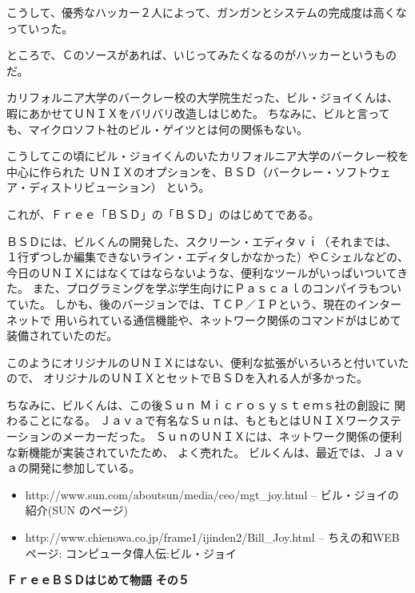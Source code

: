 \documentclass[12pt]{jarticle}
\begin{document}
こうして、優秀なハッカー２人によって、ガンガンとシステムの完成度は高くなっていった。

\bigskip

ところで、Ｃのソースがあれば、いじってみたくなるのがハッカーというものだ。

\bigskip

カリフォルニア大学のバークレー校の大学院生だった、ビル・ジョイくんは、
暇にあかせてＵＮＩＸをバリバリ改造しはじめた。
ちなみに、ビルと言っても、マイクロソフト社のビル・ゲイツとは何の関係もない。

こうしてこの頃にビル・ジョイくんのいたカリフォルニア大学のバークレー校を中心に作られた
ＵＮＩＸのオプションを、ＢＳＤ（バークレー・ソフトウェア・ディストリビューション）
という。

これが、Ｆｒｅｅ「ＢＳＤ」の「ＢＳＤ」のはじめてである。

ＢＳＤには、ビルくんの開発した、スクリーン・エディタｖｉ（それまでは、
１行ずつしか編集できないライン・エディタしかなかった）やＣシェルなどの、
今日のＵＮＩＸにはなくてはならないような、便利なツールがいっぱいついてきた。
また、プログラミングを学ぶ学生向けにＰａｓｃａｌのコンパイラもついていた。
しかも、後のバージョンでは、ＴＣＰ／ＩＰという、現在のインターネットで
用いられている通信機能や、ネットワーク関係のコマンドがはじめて装備されていたのだ。

このようにオリジナルのＵＮＩＸにはない、便利な拡張がいろいろと付いていたので、
オリジナルのＵＮＩＸとセットでＢＳＤを入れる人が多かった。

\bigskip

ちなみに、ビルくんは、この後Ｓｕｎ Ｍｉｃｒｏｓｙｓｔｅｍｓ社の創設に
関わることになる。
Ｊａｖａで有名なＳｕｎは、もともとはＵＮＩＸワークステーションのメーカーだった。
ＳｕｎのＵＮＩＸには、ネットワーク関係の便利な新機能が実装されていたため、
よく売れた。
ビルくんは、最近では、Ｊａｖａの開発に参加している。

\begin{itemize}
\item http://www.sun.com/aboutsun/media/ceo/mgt\_joy.html -- ビル・ジョイの紹介(SUN のページ)
\item http://www.chienowa.co.jp/frame1/ijinden2/Bill\_Joy.html -- ちえの和WEBページ: コンピュータ偉人伝:ビル・ジョイ
\end{itemize}
\newpage

\noindent
\textbf{\Huge ＦｒｅｅＢＳＤはじめて物語}
\hspace{1cm}
\textbf{\LARGE その５}

\bigskip
\end{document}
